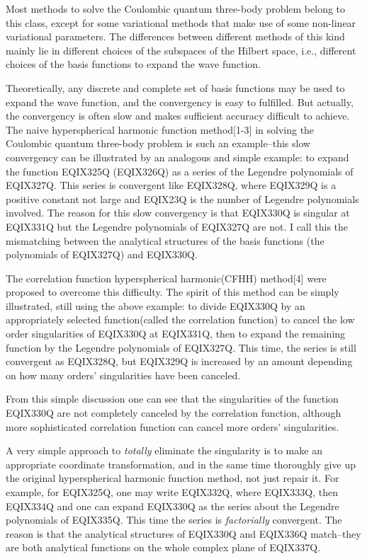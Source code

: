 Most methods to solve the Coulombic quantum three-body problem belong to
this class, except for some variational methods that make use of some
non-linear
variational parameters. The differences between different methods of this kind
mainly lie in different choices of the subspaces of the Hilbert space,
i.e., different choices of
the basis functions to expand the wave function.

Theoretically, any discrete
and complete set of basis functions may be used to expand the wave function,
and the convergency is easy to fulfilled. But actually, the convergency is
often slow and makes sufficient accuracy difficult to achieve. The naive
hyperspherical harmonic function method[1-3] in solving the Coulombic quantum
three-body problem is such an example--this slow convergency can be illustrated
by an analogous and simple example: to expand the function EQIX325Q
(EQIX326Q) as a series of the Legendre polynomials of EQIX327Q. This series
is convergent like EQIX328Q, where EQIX329Q is a positive constant not large and EQIX23Q is
the number of Legendre polynomials involved. The reason for this slow
convergency is that EQIX330Q is singular at EQIX331Q but the Legendre
polynomials of EQIX327Q are not. I call this the mismatching between the analytical
structures of the basis functions (the polynomials of EQIX327Q) and EQIX330Q.

The correlation function hyperspherical harmonic(CFHH) method[4] were proposed to
overcome this difficulty. The spirit of this method can be simply illustrated,
still using the above example: to divide EQIX330Q by an appropriately selected
function(called the correlation function) to cancel the low order singularities
of EQIX330Q at EQIX331Q, then to expand the remaining function by the
Legendre polynomials of EQIX327Q. This time, the series is still convergent as
EQIX328Q, but EQIX329Q is increased by an amount depending on how many orders'
singularities have been canceled.

From this simple discussion one can see that the singularities of the function
EQIX330Q are not completely canceled by the correlation function, although more
sophisticated correlation function can cancel more orders' singularities.

A very simple approach to \emph{totally} eliminate the singularity is
to make an appropriate coordinate transformation,
and in the same time thoroughly give up the original hyperspherical
harmonic function method, not just repair it.
For example, for EQIX325Q, one may write EQIX332Q, where
EQIX333Q, then EQIX334Q and one can expand EQIX330Q
as the series about the Legendre polynomials of EQIX335Q.
This time the series is \emph{factorially} convergent. The reason is that
the analytical structures of EQIX330Q and EQIX336Q match--they are
both analytical functions on the whole complex plane of EQIX337Q.

